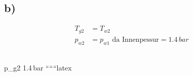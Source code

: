 

\subsection*{b)}

\begin{align*}
T_{g2} &= T_{w2} \\
p_{w2} &= p_{w1} \text{ da Innenpessur} = 1.4\,bar
\end{align*}

 \\
p_{g2}  1.4\,bar
``````latex